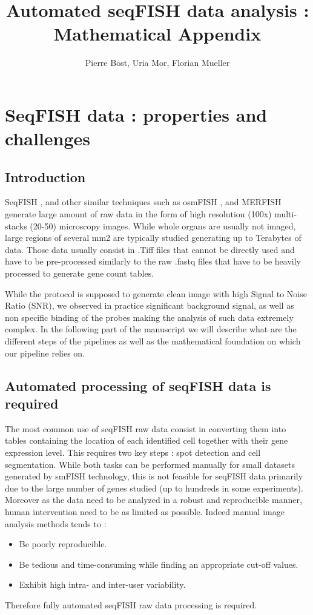 \documentclass[12pt]{article}
\title{Automated seqFISH data analysis : Mathematical Appendix}
\author{Pierre Bost, Uria Mor, Florian Mueller}
\begin{document}
\maketitle

{
  \hypersetup{linkcolor=black}
  \tableofcontents
}
\newpage


\section{SeqFISH data : properties and challenges}


\subsection{Introduction}

SeqFISH \citep{shah_situ_2016,eng_transcriptome-scale_2019}, and other similar techniques such as osmFISH \citep{codeluppi_spatial_2018}, and MERFISH \citep{chen_spatially_2015} generate large amount of raw data in the form of high resolution (100x) multi-stacks (20-50) microscopy images. While whole organs are usually not imaged, large regions of several mm2 are typically studied generating up to Terabytes of data. Those data usually consist in .Tiff files that cannot be directly used and  have to be pre-processed similarly to the raw .fastq files that have to be heavily processed to generate gene count tables.

While the protocol is supposed to generate clean image with high Signal to Noise Ratio (SNR), we observed in practice significant background signal, as well as non specific binding of the probes making the analysis of such data extremely complex. In the following part of the manuscript we will describe what are the different steps of the pipelines as well as the mathematical foundation on which our pipeline relies on.

\subsection{Automated processing of seqFISH data is required}

The most common use of seqFISH raw data consist in converting them into tables containing the location of each identified cell together with their gene expression level. This requires two key steps : spot detection and cell segmentation. While both tasks can be performed manually for small datasets generated by smFISH technology, this is not feasible for seqFISH data primarily due to the large number of genes studied (up to hundreds in some experiments). Moreover as the data need to be analyzed in a robust and reproducible manner, human intervention need to be as limited as possible. Indeed manual image analysis methods tends to  :
\begin{itemize}
\item Be poorly reproducible.
\item Be tedious and time-consuming while finding an appropriate cut-off values.
\item Exhibit high intra- and inter-user variability.
\end{itemize}
Therefore fully automated seqFISH raw data processing is required.
\end{document}
